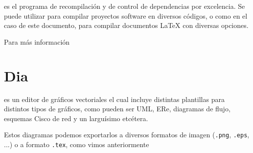  es el programa de recompilación y de control de
dependencias por excelencia. Se puede utilizar para compilar proyectos
software en diversos códigos, o como en el caso de este documento,
para compilar documentos \LaTeX{} con diversas opciones.

Para más información \cite{website:voipinfo}

\section*{Dia}

 es un editor de gráficos vectoriales el cual incluye
distintas plantillas para distintos tipos de gráficos, como pueden ser
UML, ERe, diagramas de flujo, esquemas Cisco de red y un larguísimo
etcétera.

Estos diagramas podemos exportarlos a diversos formatos de imagen
(\texttt{.png}, \texttt{.eps}, ...) o a formato \texttt{.tex}, como
vimos anteriormente \cite{atdg11}